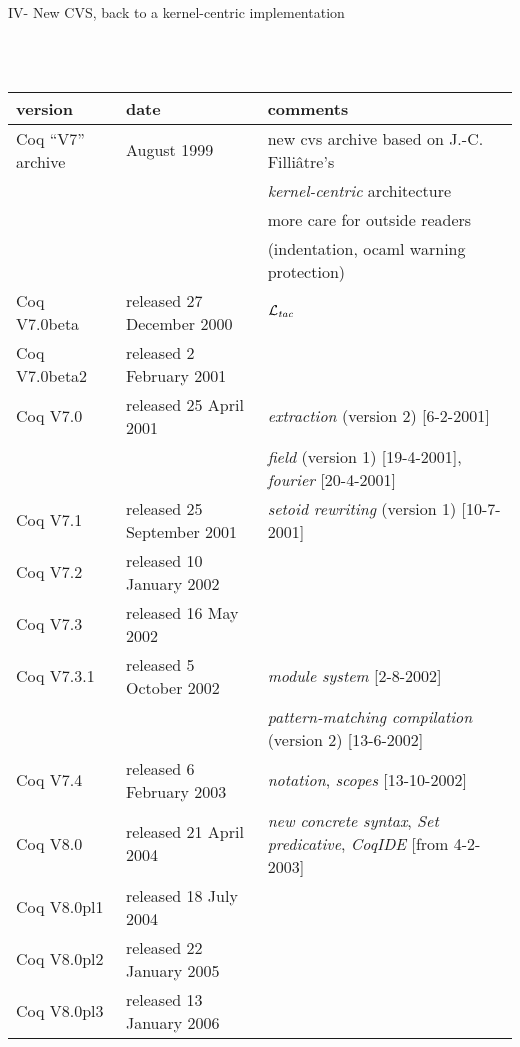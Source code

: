 \documentclass[a4paper]{book}
\newcommand{\feature}[1]{{\em #1}}
\begin{document}
\newpage
\centerline{IV- New CVS, back to a kernel-centric implementation}
\mbox{}\\
\mbox{}\\
\begin{tabular}{l|l|l}
version & date & comments \\
\hline
Coq ``V7'' archive & August 1999 & new cvs archive based on J.-C. Filliâtre's \\
   & & \feature{kernel-centric} architecture \\
   & & more care for outside readers\\
   & & (indentation, ocaml warning protection)\\
Coq V7.0beta& released 27 December 2000 & \feature{${\cal L}_{\mathit{tac}}$} \\
Coq V7.0beta2& released 2 February 2001\\

Coq V7.0& released 25 April 2001 & \feature{extraction} (version 2) [6-2-2001] \\
  & & \feature{field} (version 1) [19-4-2001], \feature{fourier} [20-4-2001] \\

Coq V7.1& released 25 September 2001 & \feature{setoid rewriting} (version 1) [10-7-2001]\\

Coq V7.2& released 10 January 2002\\

Coq V7.3& released 16 May 2002\\

Coq V7.3.1& released 5 October 2002 & \feature{module system} [2-8-2002]\\
  & & \feature{pattern-matching compilation} (version 2) [13-6-2002]\\

Coq V7.4& released 6 February 2003 & \feature{notation}, \feature{scopes} [13-10-2002]\\

Coq V8.0& released 21 April 2004 & \feature{new concrete syntax}, \feature{Set predicative}, \feature{CoqIDE} [from 4-2-2003]\\

Coq V8.0pl1& released 18 July 2004\\

Coq V8.0pl2& released 22 January 2005\\

Coq V8.0pl3& released 13 January 2006\\


\end{tabular}
\end{document}
